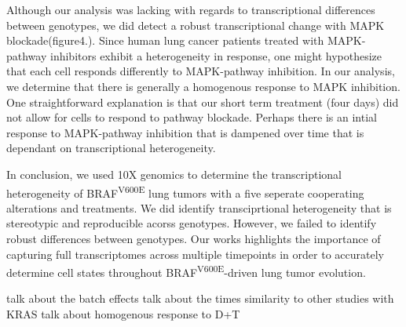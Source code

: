 Although our analysis was lacking with regards to transcriptional differences between genotypes, we did detect a robust transcriptional change with MAPK blockade(figure4.). Since human lung cancer patients treated with MAPK-pathway inhibitors exhibit a heterogeneity in response, one might hypothesize that each cell responds differently to MAPK-pathway inhibition. In our analysis, we determine that there is generally a homogenous response to MAPK inhibition. One straightforward explanation is that our short term treatment (four days) did not allow for cells to respond to pathway blockade. Perhaps there is an intial response to MAPK-pathway inhibition that is dampened over time that is dependant on transcriptional heterogeneity.

In conclusion, we used 10X genomics to determine the transcriptional heterogeneity of BRAF\textsuperscript{V600E} lung tumors with a five seperate cooperating alterations and treatments. We did identify transciprtional heterogeneity that is stereotypic and reproducible acorss genotypes. However, we failed to identify robust differences between genotypes. Our works highlights the importance of capturing full transcriptomes across multiple timepoints in order to accurately determine cell states throughout BRAF\textsuperscript{V600E}-driven lung tumor evolution.

talk about the batch effects
talk about the times
similarity to other studies with KRAS
talk about homogenous response to D+T

